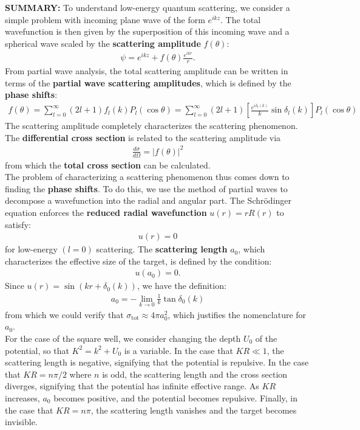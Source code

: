 \documentclass{book}
\theoremstyle{definition}
\newcommand{\p}{\partial}
\newcommand{\f}[2]{\frac{#1}{#2}}
\newcommand{\lb}{\left[}
\newcommand{\rb}{\right]}
\begin{document}
\begin{framed}
	\noindent \textbf{SUMMARY:} To understand low-energy quantum scattering, we consider a simple problem with incoming plane wave of the form $e^{ikz}$. The total wavefunction is then given by the superposition of this incoming wave and a spherical wave scaled by the \textbf{scattering amplitude} $f(\theta)$:
	\begin{align*}
		\psi = e^{ikz} + f(\theta) \f{e^{ikr}}{r}.
	\end{align*} 
	From partial wave analysis, the total scattering amplitude can be written in terms of the \textbf{partial wave scattering amplitudes}, which is defined by the \textbf{phase shifts}:
	\begin{align*}
		f(\theta) = \sum_{l=0}^\infty (2l+1) f_l(k)P_l(\cos\theta) = \sum_{l=0}^\infty (2l+1) \lb \f{e^{i\delta_l(k)}}{k}\sin \delta_l(k) \rb P_l(\cos\theta)
	\end{align*}
	The scattering amplitude completely characterizes the scattering phenomenon. The \textbf{differential cross section} is related to the scattering amplitude via
	\begin{align*}
		\f{d\sigma}{d\Omega} = |f(\theta)|^2
	\end{align*}
	from which the \textbf{total cross section} can be calculated. \\
	
	The problem of characterizing a scattering phenomenon thus comes down to finding the \textbf{phase shifts}. To do this, we use the method of partial waves to decompose a wavefunction into the radial and angular part. The Schr\"{o}dinger equation enforces the \textbf{reduced radial wavefunction} $u(r) = rR(r)$ to satisfy:
	\begin{align*}
		[\p_r^2 - U(r) + k^2] u(r) = 0
	\end{align*}
	for low-energy $(l=0)$ scattering. The \textbf{scattering length} $a_0$, which characterizes the effective size of the target, is defined by the condition:
	\begin{align*}
		u(a_0) = 0.
	\end{align*}
	Since $u(r) = \sin(kr + \delta_0(k))$, we have the definition:
	\begin{align*}
		a_0 = -\lim_{k\to 0} \f{1}{k}\tan\delta_0(k)
	\end{align*}
	from which we could verify that $\sigma_\text{tot} \approx 4\pi a_0^2$, which justifies the nomenclature for $a_0$. \\
	
	For the case of the square well, we consider changing the depth $U_0$ of the potential, so that $K^2 = k^2 + U_0$ is a variable. In the case that $KR \ll 1$, the scattering length is negative, signifying that the potential is repulsive. In the case that $KR = n\pi/2$ where $n$ is odd, the scattering length and the cross section diverges, signifying that the potential has infinite effective range. As $KR$ increases, $a_0$ becomes positive, and the potential becomes repulsive. Finally, in the case that $KR = n\pi$, the scattering length vanishes and the target becomes invisible.\\
	

\end{framed}
\end{document}
